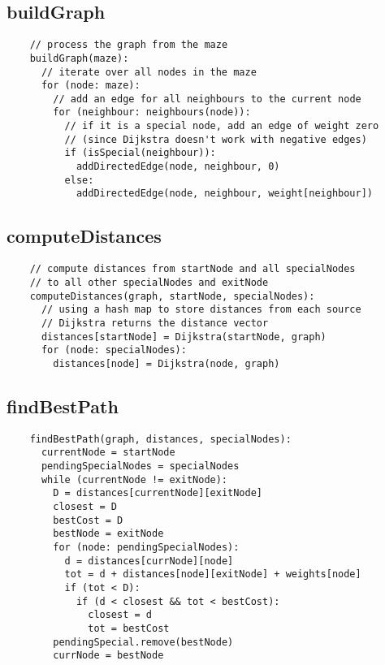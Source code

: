 \documentclass[12pt]{report}
\begin{document}
\subsection{buildGraph}
\begin{tcolorbox}
\begin{verbatim}
    // process the graph from the maze
    buildGraph(maze):
      // iterate over all nodes in the maze
      for (node: maze):
        // add an edge for all neighbours to the current node
        for (neighbour: neighbours(node)):
          // if it is a special node, add an edge of weight zero
          // (since Dijkstra doesn't work with negative edges)
          if (isSpecial(neighbour)):
            addDirectedEdge(node, neighbour, 0)
          else:
            addDirectedEdge(node, neighbour, weight[neighbour])
\end{verbatim}
\end{tcolorbox}

\subsection{computeDistances}
\begin{tcolorbox}
\begin{verbatim}
    // compute distances from startNode and all specialNodes
    // to all other specialNodes and exitNode
    computeDistances(graph, startNode, specialNodes):
      // using a hash map to store distances from each source
      // Dijkstra returns the distance vector
      distances[startNode] = Dijkstra(startNode, graph)
      for (node: specialNodes):
        distances[node] = Dijkstra(node, graph)
\end{verbatim}
\end{tcolorbox}

\subsection{findBestPath}
\begin{tcolorbox}
\begin{verbatim}
    findBestPath(graph, distances, specialNodes):
      currentNode = startNode
      pendingSpecialNodes = specialNodes
      while (currentNode != exitNode):
        D = distances[currentNode][exitNode]
        closest = D
        bestCost = D
        bestNode = exitNode
        for (node: pendingSpecialNodes):
          d = distances[currNode][node]
          tot = d + distances[node][exitNode] + weights[node]
          if (tot < D):
            if (d < closest && tot < bestCost):
              closest = d
              tot = bestCost
        pendingSpecial.remove(bestNode)
        currNode = bestNode
\end{verbatim}
\end{tcolorbox}
\end{document}
